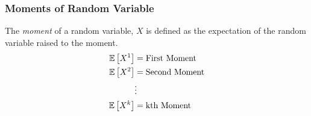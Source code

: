 \subsubsection{Moments of Random Variable}\label{subsubsec:Moments of a Random Variable}
\begin{definition}[Moment]
  The \emph{moment} of a random variable, $X$ is defined as the expectation of the random variable raised to the moment.
  \begin{equation}\label{eq:Moments of a Random Variable}
    \begin{aligned}
      \operatorname{\operatorname{\mathbb{E}}} \left[ X^{1} \right] &= \text{First Moment} \\
      \operatorname{\operatorname{\mathbb{E}}} \left[ X^{2} \right] &= \text{Second Moment} \\
      &\vdots \\
      \operatorname{\operatorname{\mathbb{E}}} \left[ X^{k} \right] &= \text{kth Moment} \\
    \end{aligned}
  \end{equation}
\end{definition}

